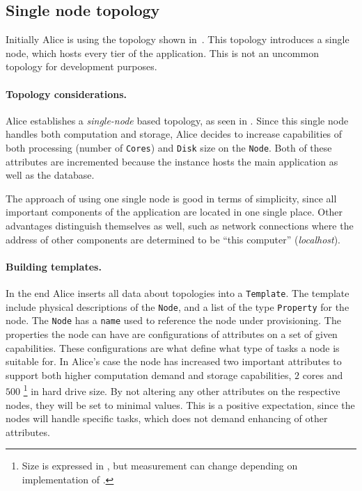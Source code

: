 \subsection{Single node topology}

Initially Alice is using the topology shown in~.
This topology introduces a single node, which hosts every tier of the application.
This is not an uncommon topology for development purposes.

\paragraph{Topology considerations.}

Alice establishes a \emph{single-node} based topology, as seen in .
Since this single node handles both computation and storage, 
Alice decides to increase capabilities of both processing (number of \texttt{Cores}) and 
\texttt{Disk} size on the \texttt{Node}.
Both of these attributes are incremented because the instance hosts
the main application as well as the database.

The approach of using one single node is good in terms of simplicity,
since all important components of the application are located in one single place.
Other advantages distinguish themselves as well, such as network connections where
the address of other components are determined to be ``this computer'' (\emph{localhost}).

\paragraph{Building templates.}

In the end Alice inserts all data about topologies into a \texttt{Template}. 
The template include physical descriptions of the \texttt{Node},
and a list of the type \texttt{Property} for the node.
The \texttt{Node} has a \texttt{name} used to reference the node under provisioning.
The properties the node can have are configurations of attributes on a set of given capabilities.
These configurations are what define what type of tasks a node is suitable for.
In Alice's case the node has increased two important attributes to support both higher computation 
demand and storage capabilities, \ie $2$ cores and $500$ \footnote{
  Size is expressed in , but measurement can change depending on implementation of .
}
in hard drive size.
By not altering any other attributes on the respective nodes, they will be set to minimal values.
This is a positive expectation, since the nodes will handle specific tasks, which does not 
demand enhancing of other attributes.

